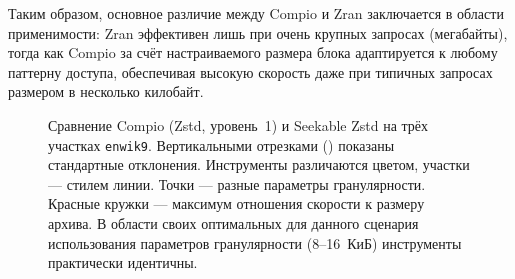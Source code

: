 Таким образом, основное различие между Compio и Zran заключается в области применимости: Zran эффективен лишь при очень крупных запросах (мегабайты), тогда как Compio за счёт настраиваемого размера блока адаптируется к любому паттерну доступа, обеспечивая высокую скорость даже при типичных запросах размером в несколько килобайт.

\begin{figure}[h]
    \centering
    
    \caption{Сравнение Compio (Zstd, уровень~1) и Seekable Zstd на трёх участках \texttt{enwik9}\cite{ltcb}. Вертикальными отрезками () показаны стандартные отклонения. Инструменты различаются цветом, участки --- стилем линии. Точки --- разные параметры гранулярности. Красные кружки --- максимум отношения скорости к размеру архива. В области своих оптимальных для данного сценария использования параметров гранулярности (8--16~КиБ) инструменты практически идентичны.}
    \label{fig:alternatives-2}
\end{figure}

